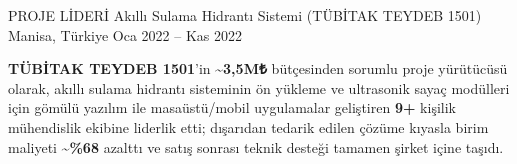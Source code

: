 \begin{cventries}
  \cventry
    {PROJE LİDERİ} %
    {Akıllı Sulama Hidrantı Sistemi (TÜBİTAK TEYDEB 1501)} %
    {Manisa, Türkiye} %
    {Oca 2022 – Kas 2022} %
    {
      \begin{cvitems} %
        \item {\textbf{TÜBİTAK TEYDEB 1501}'in \textbf{\textasciitilde3,5M₺} bütçesinden sorumlu proje yürütücüsü olarak, akıllı sulama hidrantı sisteminin ön yükleme ve ultrasonik sayaç modülleri için gömülü yazılım ile masaüstü/mobil uygulamalar geliştiren \textbf{9+} kişilik mühendislik ekibine liderlik etti; dışarıdan tedarik edilen çözüme kıyasla birim maliyeti \textbf{\textasciitilde\%68} azalttı ve satış sonrası teknik desteği tamamen şirket içine taşıdı.}
      \end{cvitems}
    }

\end{cventries}
